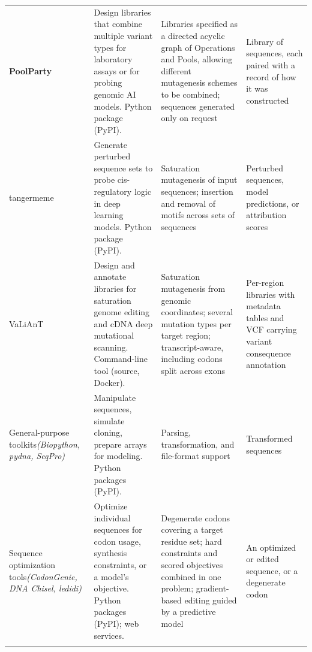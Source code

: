 \begin{table}[tbp]
\begin{tabular}{@{}>{\raggedright\arraybackslash}p{2.0cm}>{\raggedright\arraybackslash}p{3.4cm}>{\raggedright\arraybackslash}p{4.3cm}>{\raggedright\arraybackslash}p{2.15cm}@{}}
\textbf{PoolParty} &
Design libraries that combine multiple variant types for laboratory assays or for probing genomic AI models. Python package (PyPI). &
Libraries specified as a directed acyclic graph of Operations and Pools, allowing different mutagenesis schemes to be combined; sequences generated only on request &
Library of sequences, each paired with a record of how it was constructed\\
\addlinespace

tangermeme \citep{Schreiber2025nd} &
Generate perturbed sequence sets to probe cis-regulatory logic in deep learning models. Python package (PyPI). &
Saturation mutagenesis of input sequences; insertion and removal of motifs across sets of sequences &
Perturbed sequences, model predictions, or attribution scores\\
\addlinespace

VaLiAnT \citep{Barbon2022th} &
Design and annotate libraries for saturation genome editing and cDNA deep mutational scanning. Command-line tool (source, Docker). &
Saturation mutagenesis from genomic coordinates; several mutation types per target region; transcript-aware, including codons split across exons &
Per-region libraries with metadata tables and VCF carrying variant consequence annotation\\
\midrule

General-purpose toolkits\newline\textit{(Biopython, pydna, SeqPro)} \citep{Cock2009df,Pereira2015wj,Klie2023kg} &
Manipulate sequences, simulate cloning, prepare arrays for modeling. Python packages (PyPI). &
Parsing, transformation, and file-format support &
Transformed sequences\\
\addlinespace

Sequence optimization tools\newline\textit{(CodonGenie, DNA Chisel, ledidi)} \citep{Swainston2017rb,Zulkower2020jk,Schreiber2025ledidi} &
Optimize individual sequences for codon usage, synthesis constraints, or a model's objective. Python packages (PyPI); web services. &
Degenerate codons covering a target residue set; hard constraints and scored objectives combined in one problem; gradient-based editing guided by a predictive model &
An optimized or edited sequence, or a degenerate codon\\
\botrule
\end{tabular}
\end{table}
